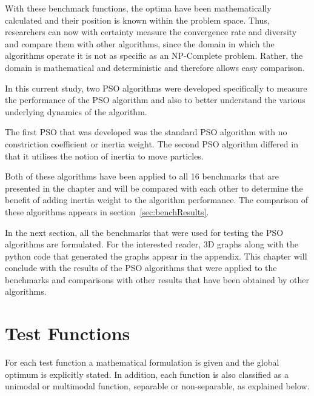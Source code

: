 With these benchmark functions, the optima have been mathematically calculated and their position is known within the problem space\cite{evalevoalgo}. Thus, researchers can now with certainty measure the convergence rate and diversity and compare them with other algorithms, since the domain in which the algorithms operate it is not as specific as an NP-Complete problem\cite{evalevoalgo}. Rather, the domain is mathematical and deterministic and therefore allows easy comparison\cite{evalevoalgo}.

In this current study, two PSO algorithms were developed specifically to measure the performance of the PSO algorithm and also to better understand the various underlying dynamics of the algorithm.

The first PSO that was developed was the standard PSO algorithm with no constriction coefficient or inertia weight. The second PSO algorithm differed in that it utilises the notion of inertia to move particles. 

Both of these algorithms have been applied to all 16 benchmarks that are presented in the chapter and will be compared with each other to determine the benefit of adding inertia weight to the algorithm performance. The comparison of these algorithms appears in section~\ref{sec:benchResults}.

In the next section, all the benchmarks that were used for testing the PSO algorithms are formulated. For the interested reader, 3D graphs along with the python code that generated the graphs appear in the appendix. This chapter will conclude with the results of the PSO algorithms that were applied to the benchmarks and comparisons with other results that have been obtained by other algorithms.
\section{Test Functions}
For each test function a mathematical formulation is given and the global optimum is explicitly stated. In addition, each function is also classified as a unimodal or multimodal function, separable or non-separable, as explained below.

